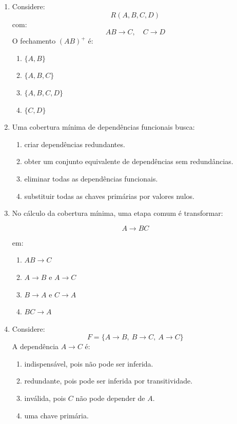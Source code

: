 \documentclass[12pt,a4paper]{article}
\begin{document}
\begin{enumerate}[label=\textbf{Q\arabic*.}]
\item Considere:
\[
R(A,B,C,D)
\]
com:
\[
AB \rightarrow C,\quad C \rightarrow D
\]
O fechamento $(AB)^+$ é:

\begin{enumerate}[label=\alph*)]
    \item $\{A,B\}$
    \item $\{A,B,C\}$
    \item $\{A,B,C,D\}$
    \item $\{C,D\}$
\end{enumerate}

\item Uma cobertura mínima de dependências funcionais busca:

\begin{enumerate}[label=\alph*)]
    \item criar dependências redundantes.
    \item obter um conjunto equivalente de dependências sem redundâncias.
    \item eliminar todas as dependências funcionais.
    \item substituir todas as chaves primárias por valores nulos.
\end{enumerate}

\item No cálculo da cobertura mínima, uma etapa comum é transformar:

\[
A \rightarrow BC
\]

em:

\begin{enumerate}[label=\alph*)]
    \item $AB \rightarrow C$
    \item $A \rightarrow B$ e $A \rightarrow C$
    \item $B \rightarrow A$ e $C \rightarrow A$
    \item $BC \rightarrow A$
\end{enumerate}

\item Considere:
\[
F = \{A \rightarrow B,\ B \rightarrow C,\ A \rightarrow C\}
\]
A dependência $A \rightarrow C$ é:

\begin{enumerate}[label=\alph*)]
    \item indispensável, pois não pode ser inferida.
    \item redundante, pois pode ser inferida por transitividade.
    \item inválida, pois $C$ não pode depender de $A$.
    \item uma chave primária.
\end{enumerate}


\end{enumerate}
\end{document}
